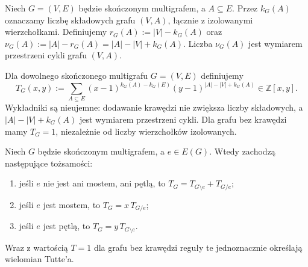 \begin{definicja}
Niech $G=(V,E)$ będzie skończonym multigrafem, a $A\subseteq E$.
Przez $k_G(A)$ oznaczamy liczbę składowych grafu $(V,A)$,
łącznie z izolowanymi wierzchołkami. Definiujemy
$r_G(A):=|V|-k_G(A)$ oraz
$\nu_G(A):=|A|-r_G(A)=|A|-|V|+k_G(A)$.
Liczba $\nu_G(A)$ jest wymiarem przestrzeni cykli grafu $(V,A)$.
\end{definicja}

\begin{definicja}
\label{def:tg-tutte}
Dla dowolnego skończonego multigrafu $G=(V,E)$ definiujemy
\[
T_G(x,y):=\sum_{A\subseteq E}
 (x-1)^{k_G(A)-k_G(E)}
 (y-1)^{|A|-|V|+k_G(A)}\in\mathbb Z[x,y].
\]
Wykładniki są nieujemne: dodawanie krawędzi nie zwiększa liczby
składowych, a $|A|-|V|+k_G(A)$ jest wymiarem przestrzeni cykli.
Dla grafu bez krawędzi mamy $T_G=1$, niezależnie od liczby
wierzchołków izolowanych.
\end{definicja}

\begin{twierdzenie}
\label{thm:tg-tutte-recursion}
Niech $G$ będzie skończonym multigrafem, a $e\in E(G)$.
Wtedy zachodzą następujące tożsamości:
\begin{enumerate}[label=(\roman*)]
\item jeśli $e$ nie jest ani mostem, ani pętlą, to
$T_G=T_{G\setminus e}+T_{G/e}$;
\item jeśli $e$ jest mostem, to $T_G=x\,T_{G/e}$;
\item jeśli $e$ jest pętlą, to $T_G=y\,T_{G\setminus e}$.
\end{enumerate}
Wraz z wartością $T=1$ dla grafu bez krawędzi reguły te
jednoznacznie określają wielomian Tutte'a.
\end{twierdzenie}

